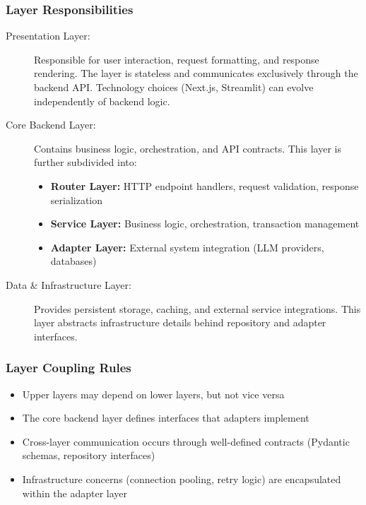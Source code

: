 \subsubsection{Layer Responsibilities}

\begin{description}
    \item[Presentation Layer:] Responsible for user interaction, request formatting, and response rendering. The layer is stateless and communicates exclusively through the backend API. Technology choices (Next.js, Streamlit) can evolve independently of backend logic.
    
    \item[Core Backend Layer:] Contains business logic, orchestration, and API contracts. This layer is further subdivided into:
    \begin{itemize}
        \item \textbf{Router Layer:} HTTP endpoint handlers, request validation, response serialization
        \item \textbf{Service Layer:} Business logic, orchestration, transaction management
        \item \textbf{Adapter Layer:} External system integration (LLM providers, databases)
    \end{itemize}
    
    \item[Data \& Infrastructure Layer:] Provides persistent storage, caching, and external service integrations. This layer abstracts infrastructure details behind repository and adapter interfaces.
\end{description}

\subsubsection{Layer Coupling Rules}

\begin{itemize}
    \item Upper layers may depend on lower layers, but not vice versa
    \item The core backend layer defines interfaces that adapters implement
    \item Cross-layer communication occurs through well-defined contracts (Pydantic schemas, repository interfaces)
    \item Infrastructure concerns (connection pooling, retry logic) are encapsulated within the adapter layer
\end{itemize}

